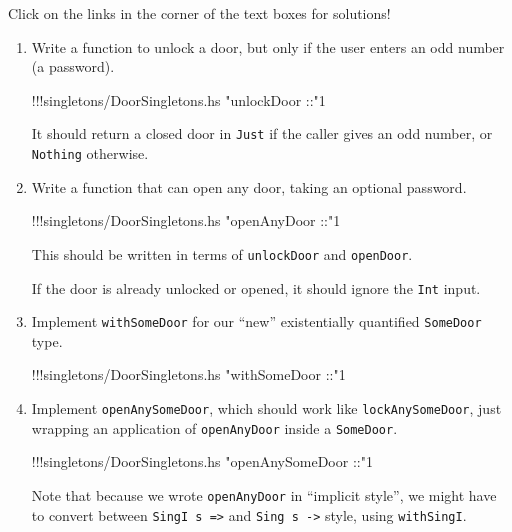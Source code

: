 \documentclass[]{article}
\newenvironment{Shaded}{}{}
\newcommand{\DecValTok}[1]{\textcolor[rgb]{0.25,0.63,0.44}{#1}}
\newcommand{\StringTok}[1]{\textcolor[rgb]{0.25,0.44,0.63}{#1}}
\newcommand{\FunctionTok}[1]{\textcolor[rgb]{0.02,0.16,0.49}{#1}}
\newcommand{\NormalTok}[1]{#1}
\begin{document}
Click on the links in the corner of the text boxes for solutions!

\begin{enumerate}
\def\labelenumi{\arabic{enumi}.}
\item
  Write a function to unlock a door, but only if the user enters an odd number
  (a password).

\begin{Shaded}
\begin{Highlighting}[]
\FunctionTok{!!!}\NormalTok{singletons}\FunctionTok{/}\NormalTok{DoorSingletons.hs }\StringTok{"unlockDoor ::"}\DecValTok{1}
\end{Highlighting}
\end{Shaded}

  It should return a closed door in \texttt{Just} if the caller gives an odd
  number, or \texttt{Nothing} otherwise.
\item
  Write a function that can open any door, taking an optional password.

\begin{Shaded}
\begin{Highlighting}[]
\FunctionTok{!!!}\NormalTok{singletons}\FunctionTok{/}\NormalTok{DoorSingletons.hs }\StringTok{"openAnyDoor ::"}\DecValTok{1}
\end{Highlighting}
\end{Shaded}

  This should be written in terms of \texttt{unlockDoor} and \texttt{openDoor}.

  If the door is already unlocked or opened, it should ignore the \texttt{Int}
  input.
\item
  Implement \texttt{withSomeDoor} for our ``new'' existentially quantified
  \texttt{SomeDoor} type.

\begin{Shaded}
\begin{Highlighting}[]
\FunctionTok{!!!}\NormalTok{singletons}\FunctionTok{/}\NormalTok{DoorSingletons.hs }\StringTok{"withSomeDoor ::"}\DecValTok{1}
\end{Highlighting}
\end{Shaded}
\item
  Implement \texttt{openAnySomeDoor}, which should work like
  \texttt{lockAnySomeDoor}, just wrapping an application of \texttt{openAnyDoor}
  inside a \texttt{SomeDoor}.

\begin{Shaded}
\begin{Highlighting}[]
\FunctionTok{!!!}\NormalTok{singletons}\FunctionTok{/}\NormalTok{DoorSingletons.hs }\StringTok{"openAnySomeDoor ::"}\DecValTok{1}
\end{Highlighting}
\end{Shaded}

  Note that because we wrote \texttt{openAnyDoor} in ``implicit style'', we
  might have to convert between \texttt{SingI\ s\ =\textgreater{}} and
  \texttt{Sing\ s\ -\textgreater{}} style, using \texttt{withSingI}.
\end{enumerate}
\end{document}
